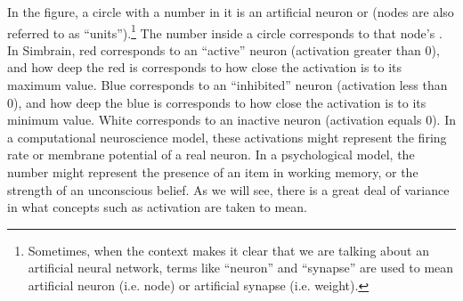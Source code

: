 In the figure, a circle with a number in it is an artificial neuron or  (nodes are also referred to as ``units'').\footnote{Sometimes, when the context makes it clear that we are talking about an artificial neural network, terms like ``neuron'' and ``synapse'' are used to mean artificial neuron (i.e. node) or artificial synapse (i.e. weight).}  The number inside a circle corresponds to that node's . In Simbrain, red corresponds to an ``active'' neuron (activation greater than 0), and how deep the red is corresponds to how close the activation is to its maximum value. Blue corresponds to an ``inhibited'' neuron (activation less than 0), and how deep the blue is corresponds to how close the activation is to its minimum value. White corresponds to an inactive neuron (activation equals 0). In a computational neuroscience model, these activations might represent the firing rate or membrane potential of a real neuron. In a psychological model, the number might represent the presence of an item in working memory, or the strength of an unconscious belief. As we will see, there is a great deal of variance in what concepts such as activation are taken to mean.
